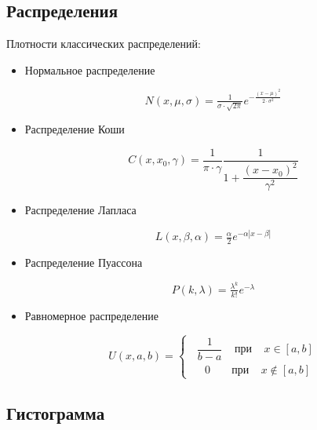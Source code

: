 
\subsection{Распределения}
Плотности классических распределений:

\begin{itemize}
  \item Нормальное распределение
  
  \begin{equation}
      N(x, \mu, \sigma) = \tfrac{1}{\sigma\cdot \sqrt{2\pi}}e^{-\tfrac{(x - \mu)^2}{2\cdot \sigma^2}}
  \end{equation}
  
  \item Распределение Коши
  
   \begin{equation}
      C(x, x_0, \gamma) = \dfrac{1}{\pi\cdot \gamma}\dfrac{1}{1 + \dfrac{(x - x_0)^2}{\gamma^2}}
  \end{equation}
  
  \item Распределение Лапласа
  
  \begin{equation}
      L(x, \beta, \alpha) =\tfrac{\alpha}{2}e^{-\alpha|x - \beta|}
  \end{equation}
  
  \item Распределение Пуассона
  
  \begin{equation}
      P(k, \lambda) = \tfrac{\lambda^k}{k!}e^{-\lambda}
  \end{equation}
  
  \item Равномерное распределение
  
    \begin{equation}
      U(x, a, b) =
        \begin{cases} 
            \;\; \dfrac{1}{b - a} \;\;\;\; \text{при} \;\;\;\; x \in [a, b]\\
            \,\,\,\:\;\; 0 \;\;\;\;\;\;\; \text{при} \;\;\;\; x \not\in [a, b]
        \end{cases}
  \end{equation}
  
\end{itemize}

\subsection{Гистограмма}

